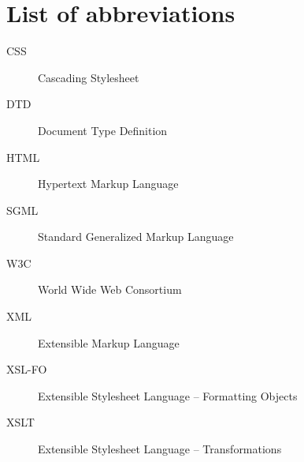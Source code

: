 \chapter{List of abbreviations}


  \begin{description}
    \item[CSS]{Cascading Stylesheet}
    \item[DTD]{Document Type Definition}
    \item[HTML]{Hypertext Markup Language}
    \item[SGML]{Standard Generalized Markup Language}
    \item[W3C]{World Wide Web Consortium}
    \item[XML]{Extensible Markup Language}
    \item[XSL-FO]{Extensible Stylesheet Language – Formatting Objects}
    \item[XSLT]{Extensible Stylesheet Language – Transformations}
  \end{description}